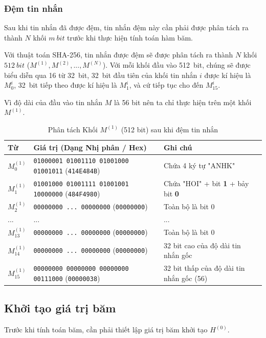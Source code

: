 \subsubsection{Đệm tin nhắn}

Sau khi tin nhắn đã được đệm, tin nhắn đệm này cần phải được phân tách ra thành $N$ khối $m~bit$ trước khi thực hiện tính toán hàm băm.

Với thuật toán SHA-256, tin nhắn được đệm sẽ được phân tách ra thành $N$ khối $512~bit$ ($M^{(1)}, M^{(2)},...,M^{(N)}$). Với mỗi khối đầu vào 512~bit, chúng sẽ được biểu diễn qua 16 từ 32~bit, 32~bit đầu tiên của khối tin nhắn $i$ được kí hiệu là $M_0^i$, 32~bit tiếp theo được kí hiệu là $M_1^i$, và cứ tiếp tục cho đến  $M_{15}^i$.

Vì độ dài của đầu vào tin nhắn $M$ là 56 bit nên ta chỉ thực hiện trên một khối $M^{(1)}$.

\begin{table}[h]
	\centering
	\renewcommand{\arraystretch}{1.5}
	\begin{tabular}{|l|p{6cm}|l|}
		\hline
		\textbf{Từ} & \textbf{Giá trị (Dạng Nhị phân / Hex)} & \textbf{Ghi chú} \\ \hline
		$M_0^{(1)}$ & \texttt{01000001 01001110 01001000 01001011} (\texttt{414E484B}) & Chứa 4 ký tự "ANHK" \\ \hline
		$M_1^{(1)}$ & \texttt{01001000 01001111 01001001 10000000} (\texttt{484F4980}) & Chứa "HOI" + bit \textbf{1} + bảy bit \textbf{0} \\ \hline
		$M_2^{(1)}$ & \texttt{00000000 ... 00000000} (\texttt{00000000}) & Toàn bộ là bit 0 \\ \hline
		... & ... & ... \\ \hline
		$M_{13}^{(1)}$ & \texttt{00000000 ... 00000000} (\texttt{00000000}) & Toàn bộ là bit 0 \\ \hline
		$M_{14}^{(1)}$ & \texttt{00000000 ... 00000000} (\texttt{00000000}) & 32 bit cao của độ dài tin nhắn gốc \\ \hline
		$M_{15}^{(1)}$ & \texttt{00000000 00000000 00000000 00111000} (\texttt{00000038}) & 32 bit thấp của độ dài tin nhắn gốc (56) \\ \hline
	\end{tabular}
	\caption{Phân tách Khối $M^{(1)}$ (512 bit) sau khi đệm tin nhắn}
\end{table}

\subsection{Khởi tạo giá trị băm}
Trước khi tính toán băm, cần phải thiết lập giá trị băm khởi tạo $H^{(0)}$.


